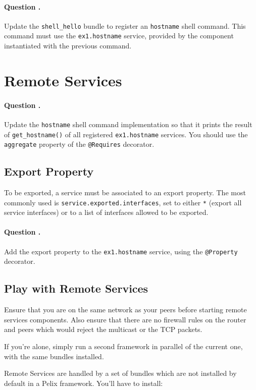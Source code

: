 \documentclass[a4paper, 12pt]{article}
\newcounter{question}
\newcommand\Question{%
  \stepcounter{question}%
  \paragraph{\hspace{2ex} Question \thequestion.}
}
\newenvironment{noteblock}[1]{%
    \tcolorbox[beamer,%
    noparskip,breakable,
    colback=LightGreen,colframe=DarkGreen,%
    colbacklower=LimeGreen!75!LightGreen,%
    title=\textbf{#1}]}%
    {\endtcolorbox}
\begin{document}
\Question Update the \texttt{shell\_hello} bundle to register an \texttt{hostname} shell command.
This command must use the \texttt{ex1.hostname} service, provided by the component instantiated with the previous command.

\section{Remote Services}

\Question Update the \texttt{hostname} shell command implementation so that it prints the result of \texttt{get\_hostname()} of all registered \texttt{ex1.hostname} services.
You should use the \texttt{aggregate} property of the \texttt{@Requires} decorator.

\subsection{Export Property}

To be exported, a service must be associated to an export property.
The most commonly used is \texttt{service.exported.interfaces}, set to either \texttt{*} (export all service interfaces) or to a list of interfaces allowed to be exported.

\Question Add the export property to the \texttt{ex1.hostname} service, using the \texttt{@Property} decorator.

\subsection{Play with Remote Services}

\begin{noteblock}{Check the access to your peers before trying to call them...}
Ensure that you are on the same network as your peers before starting remote services components.
Also ensure that there are no firewall rules on the router and peers which would reject the multicast or the TCP packets.

\vspace{1em}
If you're alone, simply run a second framework in parallel of the current one, with the same bundles installed.
\end{noteblock}

\vspace{1em}

Remote Services are handled by a set of bundles which are not installed by default in a Pelix framework.
You'll have to install:
\end{document}
